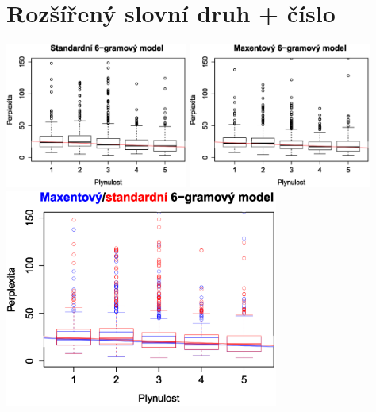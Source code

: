 \documentclass[12pt,a4paper]{report}
\begin{document}
\section{Rozšířený slovní druh + číslo}
\begin{center}
	\includegraphics[width=60mm]{./grafy/morf/ngram/rsd+cislo.svg.eps}
	\includegraphics[width=60mm]{./grafy/morf/maxent/rsd+cislo.svg.eps}
	\includegraphics[width=90mm]{./grafy/morf/porovnani/rsd+cislo.svg.eps}	
\end{center}
\end{document}

